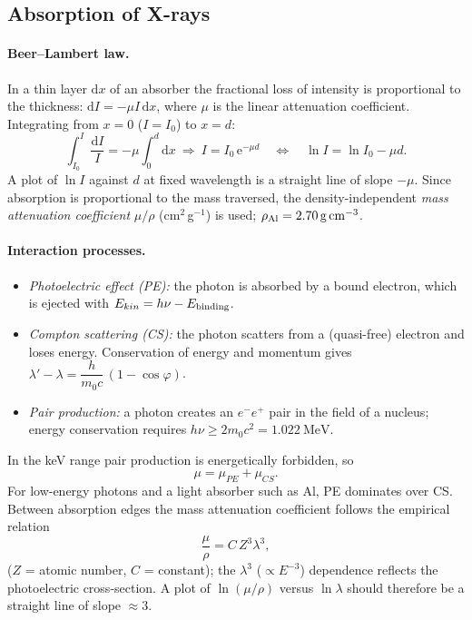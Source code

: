 \documentclass[11pt,a4paper]{article}
\newcommand{\dd}{\mathrm{d}}
\newcommand{\eu}{\mathrm{e}}
\begin{document}
\subsection{Absorption of X-rays}
\paragraph{Beer--Lambert law.} In a thin layer $\dd x$ of an absorber the fractional loss of intensity is proportional to the thickness: $\dd I=-\mu I\,\dd x$, where $\mu$ is the linear attenuation coefficient. Integrating from $x=0$ ($I=I_0$) to $x=d$:
\begin{equation}
\int_{I_0}^{I}\frac{\dd I}{I}=-\mu\int_0^d \dd x\ \Longrightarrow\ I=I_0\,\eu^{-\mu d}
\quad\Longleftrightarrow\quad
\ln I=\ln I_0-\mu d .
\label{eq:beer}
\end{equation}
A plot of $\ln I$ against $d$ at fixed wavelength is a straight line of slope $-\mu$. Since absorption is proportional to the mass traversed, the density-independent \emph{mass attenuation coefficient} $\mu/\rho$ (cm$^2$\,g$^{-1}$) is used; $\rho_{\rm Al}=\SI{2.70}{\gram\per\cubic\centi\metre}$.

\paragraph{Interaction processes.}
\begin{itemize}[nosep]
\item \emph{Photoelectric effect (PE):} the photon is absorbed by a bound electron, which is ejected with $E_{kin}=h\nu-E_{\rm binding}$.
\item \emph{Compton scattering (CS):} the photon scatters from a (quasi-free) electron and loses energy. Conservation of energy and momentum gives $\lambda'-\lambda=\dfrac{h}{m_0c}\,(1-\cos\varphi)$.
\item \emph{Pair production:} a photon creates an $e^-e^+$ pair in the field of a nucleus; energy conservation requires $h\nu\ge 2m_0c^2=\SI{1.022}{\mega\electronvolt}$.
\end{itemize}
In the keV range pair production is energetically forbidden, so
\begin{equation}
\mu=\mu_{PE}+\mu_{CS}.
\end{equation}
For low-energy photons and a light absorber such as Al, PE dominates over CS. Between absorption edges the mass attenuation coefficient follows the empirical relation
\begin{equation}
\frac{\mu}{\rho}=C\,Z^{3}\lambda^{3},
\label{eq:lambda3}
\end{equation}
($Z$ = atomic number, $C$ = constant); the $\lambda^3$ ($\propto E^{-3}$) dependence reflects the photoelectric cross-section. A plot of $\ln(\mu/\rho)$ versus $\ln\lambda$ should therefore be a straight line of slope $\approx3$.
\end{document}
